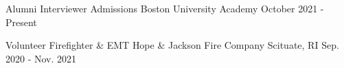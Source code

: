 
\vspace{-2mm}
\begin{cventries}

  \cventry
  {Alumni Interviewer} %
  {Admissions} %
  {Boston University Academy} %
  {October 2021 - Present} %
  {}

  \cventry
  {Volunteer Firefighter \& EMT} %
  {Hope \& Jackson Fire Company} %
  {Scituate, RI} %
  {Sep. 2020 - Nov. 2021} %
  {}

\end{cventries}
